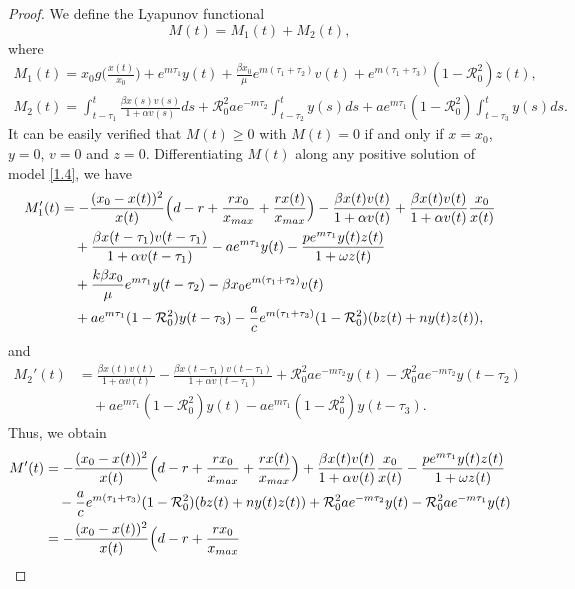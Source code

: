 \documentclass[10pt,a4paper]{amsart}
\numberwithin{equation}{section}
\begin{document}
\begin{proof}
We define the Lyapunov functional 
$$
M(t)=M_{1}(t)+M_{2}(t),
$$
where
\begin{gather*}
M_{1}(t)=x_0 g\Big(\frac{x(t)}{x_0}\Big)
+e^{m\tau_1}y(t)+\frac{\beta x_0}{\mu}e^{m(\tau_1+\tau_2)}v(t)
+e^{m(\tau_1+\tau_3)}(1-\mathcal{R}_0^{2})z(t),
\\
M_{2}(t)=\int _{t-\tau_{1}}^{t}\frac{\beta x(s)v(s)}{1+\alpha v(s)}ds
+\mathcal{R}_0^{2}ae^{-m\tau_2}\int_{t-\tau_{2}}^{t}y(s)ds
+ae^{m\tau_1}(1-\mathcal{R}_0^{2}) \int _{t-\tau_{3}}^{t}y(s)ds.
\end{gather*}
It can be easily verified that $M(t)\geq 0$ with  $M(t)= 0$ if and only if 
$x=x_0$, $y=0$, $v=0$ and $z=0$.
 Differentiating $M(t)$ along  any positive solution of model \eqref{1.4}, we have
\begin{align*}
M_{1}'(t)
&= -\frac{(x_0-x(t))^{2}}{x(t)}\Big(d-r+\frac{rx_0}{x_{\rm max}}
 +\frac{rx(t)}{x_{\rm max}}\Big)-\frac{\beta x(t)v(t)}{1+\alpha v(t)}
 +\frac{\beta x(t)v(t)}{1+\alpha v(t)}\frac{x_0}{x(t)} \\
&\quad +\frac{\beta x(t-\tau_{1})v(t-\tau_{1})}{1+\alpha v(t-\tau_{1})}
 -ae^{m\tau_1}y(t)-\frac{pe^{m\tau_{1}} y(t)z(t)}{1+\omega z(t)}\\
&\quad +\frac{k\beta x_0}{\mu}e^{m\tau_1}y(t-\tau_{2})-\beta x_0e^{m(\tau_1+\tau_2)}v(t) \\
&\quad +ae^{m\tau_1}(1-\mathcal{R}_0^{2})y(t-\tau_{3})
 -\frac{a}{c}e^{m(\tau_1+\tau_3)}(1-\mathcal{R}_0^{2})(bz(t)+ny(t)z(t)),
\end{align*}
and
\begin{align*}
M_{2}'(t)
&= \frac{\beta x(t)v(t)}{1+\alpha v(t)}
 -\frac{\beta x(t-\tau_{1})v(t-\tau_{1})}{1+\alpha v(t-\tau_{1})}
+\mathcal{R}_0^{2}ae^{-m\tau_2}y(t)-\mathcal{R}_0^{2}ae^{-m\tau_2}y(t-\tau_{2})\\
&\quad +ae^{m\tau_1}(1-\mathcal{R}_0^{2})y(t)-ae^{m\tau_1}
 (1-\mathcal{R}_0^{2})y(t-\tau_{3}).
\end{align*}
Thus,  we obtain
\begin{align*}
M'(t)&= -\frac{(x_0-x(t))^{2}}{x(t)}\Big(d-r+\frac{rx_0}{x_{\rm max}}
 +\frac{rx(t)}{x_{\rm max}}\Big)+\frac{\beta x(t)v(t)}{1+\alpha v(t)}\frac{x_0}{x(t)}
-\frac{pe^{m\tau_{1}} y(t)z(t)}{1+\omega z(t)}\\
&\quad -\frac{a}{c}e^{m(\tau_1+\tau_3)}(1-\mathcal{R}_0^{2})(bz(t)+ny(t)z(t))
 +\mathcal{R}_0^{2}ae^{-m\tau_2}y(t)-\mathcal{R}_0^{2}ae^{-m\tau_1}y(t)\\
&= -\frac{(x_0-x(t))^{2}}{x(t)}\Big(d-r+\frac{rx_0}{x_{\rm max}}

\end{align*}
\end{proof}
\end{document}
